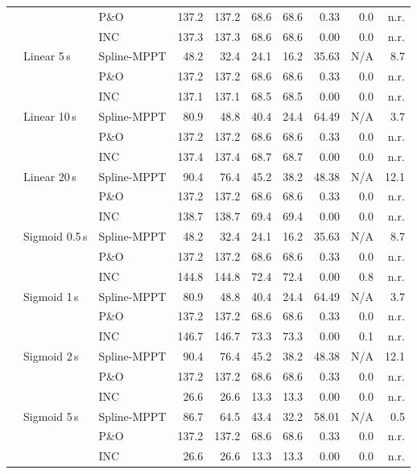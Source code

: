 \begin{longtable}{@{}lll rr rr r rr@{}}
 &  & P\&O & 137.2 & 137.2 & 68.6 & 68.6 & 0.33 & 0.0 & n.r. \\
 &  & INC & 137.3 & 137.3 & 68.6 & 68.6 & 0.00 & 0.0 & n.r. \\
\addlinespace[2pt]
 & Linear 5\,s & Spline-MPPT & 48.2 & 32.4 & 24.1 & 16.2 & 35.63 & N/A & 8.7 \\
 &  & P\&O & 137.2 & 137.2 & 68.6 & 68.6 & 0.33 & 0.0 & n.r. \\
 &  & INC & 137.1 & 137.1 & 68.5 & 68.5 & 0.00 & 0.0 & n.r. \\
\addlinespace[2pt]
 & Linear 10\,s & Spline-MPPT & 80.9 & 48.8 & 40.4 & 24.4 & 64.49 & N/A & 3.7 \\
 &  & P\&O & 137.2 & 137.2 & 68.6 & 68.6 & 0.33 & 0.0 & n.r. \\
 &  & INC & 137.4 & 137.4 & 68.7 & 68.7 & 0.00 & 0.0 & n.r. \\
\addlinespace[2pt]
 & Linear 20\,s & Spline-MPPT & 90.4 & 76.4 & 45.2 & 38.2 & 48.38 & N/A & 12.1 \\
 &  & P\&O & 137.2 & 137.2 & 68.6 & 68.6 & 0.33 & 0.0 & n.r. \\
 &  & INC & 138.7 & 138.7 & 69.4 & 69.4 & 0.00 & 0.0 & n.r. \\
\addlinespace[2pt]
 & Sigmoid 0.5\,s & Spline-MPPT & 48.2 & 32.4 & 24.1 & 16.2 & 35.63 & N/A & 8.7 \\
 &  & P\&O & 137.2 & 137.2 & 68.6 & 68.6 & 0.33 & 0.0 & n.r. \\
 &  & INC & 144.8 & 144.8 & 72.4 & 72.4 & 0.00 & 0.8 & n.r. \\
\addlinespace[2pt]
 & Sigmoid 1\,s & Spline-MPPT & 80.9 & 48.8 & 40.4 & 24.4 & 64.49 & N/A & 3.7 \\
 &  & P\&O & 137.2 & 137.2 & 68.6 & 68.6 & 0.33 & 0.0 & n.r. \\
 &  & INC & 146.7 & 146.7 & 73.3 & 73.3 & 0.00 & 0.1 & n.r. \\
\addlinespace[2pt]
 & Sigmoid 2\,s & Spline-MPPT & 90.4 & 76.4 & 45.2 & 38.2 & 48.38 & N/A & 12.1 \\
 &  & P\&O & 137.2 & 137.2 & 68.6 & 68.6 & 0.33 & 0.0 & n.r. \\
 &  & INC & 26.6 & 26.6 & 13.3 & 13.3 & 0.00 & 0.0 & n.r. \\
\addlinespace[2pt]
 & Sigmoid 5\,s & Spline-MPPT & 86.7 & 64.5 & 43.4 & 32.2 & 58.01 & N/A & 0.5 \\
 &  & P\&O & 137.2 & 137.2 & 68.6 & 68.6 & 0.33 & 0.0 & n.r. \\
 &  & INC & 26.6 & 26.6 & 13.3 & 13.3 & 0.00 & 0.0 & n.r. \\

\end{longtable}
